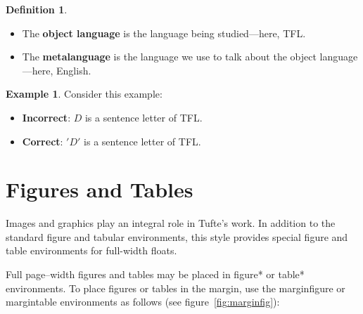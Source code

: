 \documentclass{tufte-handout}
\newcommand{\docenv}[1]{\textsf{#1}}%
\theoremstyle{definition}
\newtheorem{defn}{Definition}
\theoremstyle{example}
\newtheorem{exmp}{Example}
\theoremstyle{remark}
\begin{document}
\begin{defn}
  \begin{itemize}
      \item The \textbf{object language} is the language being studied—here, TFL.
      \item The \textbf{metalanguage} is the language we use to talk about the object language—here, English.
  \end{itemize}
\end{defn}
\begin{exmp}
  Consider this example:
  \begin{itemize}
      \item \textbf{Incorrect}: \( D \) is a sentence letter of TFL.
      \item \textbf{Correct}: \( 'D' \) is a sentence letter of TFL.
  \end{itemize}
\end{exmp}
\section{Figures and Tables}\label{sec:figures-and-tables}
Images and graphics play an integral role in Tufte's work. In addition to the
standard \docenv{figure} and \docenv{tabular} environments, this style provides
special figure and table environments for full-width floats.

Full page--width figures and tables may be placed in \docenv{figure*} or
\docenv{table*} environments. To place figures or tables in the margin, use the
\docenv{marginfigure} or \docenv{margintable} environments as follows (see
figure~\ref{fig:marginfig}):
\end{document}
